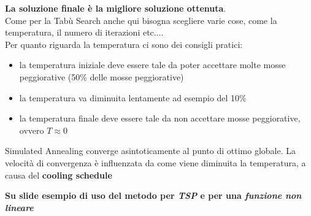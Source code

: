 \documentclass[a4paper,12pt, oneside]{book}
\begin{document}
\textbf{La soluzione finale è la migliore soluzione ottenuta}.\\
Come per la Tabù Search anche qui bisogna scegliere varie cose, come
la temperatura, il numero di iterazioni etc$\ldots$.\\
Per quanto riguarda la temperatura ci sono dei consigli pratici:
\begin{itemize}
  \item la temperatura iniziale deve essere tale da poter accettare
  molte mosse peggiorative (50\% delle mosse peggiorative)
  \item la temperatura va diminuita lentamente ad esempio del 10\%
  \item la temperatura finale deve essere tale da non accettare mosse
  peggiorative, ovvero $T\approx 0$
\end{itemize}
\begin{teorema}
  Simulated Annealing converge asintoticamente al punto di ottimo
  globale. La velocità di convergenza è influenzata da come viene
  diminuita la temperatura, a causa del \textbf{cooling schedule}
\end{teorema}
\textbf{Su slide esempio di uso del metodo per \textit{TSP} e per una
  \textit{funzione non lineare}}
\end{document}
